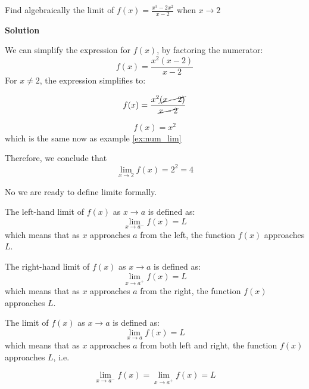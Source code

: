 \begin{example}
  Find algebraically the limit of  $f(x) = \frac{x^3 - 2x^2}{x - 2} $ when $x \to  2$

  

\end{example}

\textbf{Solution}



We can simplify the expression for \( f(x) \),
by factoring the numerator:
\[
f(x) = \frac{x^2(x - 2)}{x - 2}
\]
For \( x \neq 2 \), the expression simplifies to:


\[
f(x) = \frac{x^2 \cancel{(x - 2)}}{ \cancel{x - 2}}
\]

\[
f(x) = x^2
\]
which is the same now as example \eqref{ex:num_lim}

Therefore, we conclude that
\[
\lim_{x \to 2} f(x) = 2^2 = 4
\]



No we are ready to define limite formally.

\begin{definition}
The left-hand limit of \( f(x) \) as \( x \to a \) is defined as:
\[
\lim_{x \to a^-} f(x) = L
\]
which means that as \( x \) approaches \( a \) from the left, the function \( f(x) \) approaches \( L \).

\end{definition}

\begin{definition}

The right-hand limit of \( f(x) \) as \( x \to a \) is defined as:
\[
\lim_{x \to a^+} f(x) = L
\]
which means that as \( x \) approaches \( a \) from the right, the function \( f(x) \) approaches \( L \).

\end{definition}



\begin{definition}[Limit]

The limit of \( f(x) \) as \( x \to a \) is defined as:
\[
\lim_{x \to a} f(x) = L
\]
which means that as \( x \) approaches \( a \) from both left and right, the function \( f(x) \) approaches \( L \), i.e.

\[
\lim_{x \to a^{-}} f(x) = \lim_{x \to a^{+}} f(x) = L
\]

\end{definition}


